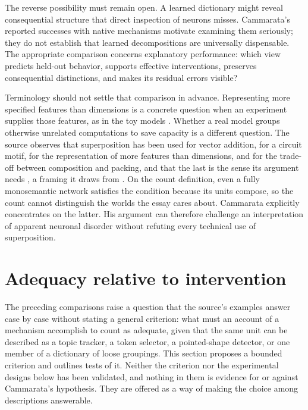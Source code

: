 \documentclass[11pt]{article}
\begin{document}
The reverse possibility must remain open. A learned dictionary might reveal consequential structure that direct inspection of neurons misses. Cammarata's reported successes with native mechanisms motivate examining them seriously; they do not establish that learned decompositions are universally dispensable. The appropriate comparison concerns explanatory performance: which view predicts held-out behavior, supports effective interventions, preserves consequential distinctions, and makes its residual errors visible?

Terminology should not settle that comparison in advance. Representing more specified features than dimensions is a concrete question when an experiment supplies those features, as in the toy models \cite{elhage2022}. Whether a real model groups otherwise unrelated computations to save capacity is a different question. The source observes that superposition has been used for vector addition, for a circuit motif, for the representation of more features than dimensions, and for the trade-off between composition and packing, and that the last is the sense its argument needs \cite[\emph{A Note on ``Superposition''}]{cammarata}, a framing it draws from \cite{olah2023}. On the count definition, even a fully monosemantic network satisfies the condition because its units compose, so the count cannot distinguish the worlds the essay cares about. Cammarata explicitly concentrates on the latter. His argument can therefore challenge an interpretation of apparent neuronal disorder without refuting every technical use of superposition.

\section{Adequacy relative to intervention}

The preceding comparisons raise a question that the source's examples answer case by case without stating a general criterion: what must an account of a mechanism accomplish to count as adequate, given that the same unit can be described as a topic tracker, a token selector, a pointed-shape detector, or one member of a dictionary of loose groupings. This section proposes a bounded criterion and outlines tests of it. Neither the criterion nor the experimental designs below has been validated, and nothing in them is evidence for or against Cammarata's hypothesis. They are offered as a way of making the choice among descriptions answerable.
\end{document}
